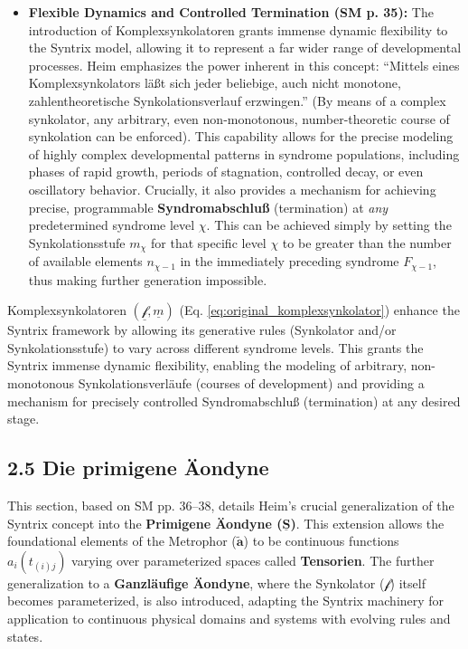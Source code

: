 \documentclass[12pt]{article}
\newcommand{\q}[1]{\enquote{#1}}
\newcommand{\metrophor}{\bm{\widetilde{a}}}
\newcommand{\synkolator}{\mathcal{f}}
\newcommand{\synkolationsstufe}{m}
\newcommand{\syndrom}{F} %
\begin{document}
\begin{itemize}
    \item \textbf{Flexible Dynamics and Controlled Termination (SM p. 35):}
    The introduction of Komplexsynkolatoren grants immense dynamic flexibility to the Syntrix model, allowing it to represent a far wider range of developmental processes. Heim emphasizes the power inherent in this concept: \q{Mittels eines Komplexsynkolators läßt sich jeder beliebige, auch nicht monotone, zahlentheoretische Synkolationsverlauf erzwingen.} (By means of a complex synkolator, any arbitrary, even non-monotonous, number-theoretic course of synkolation can be enforced). This capability allows for the precise modeling of highly complex developmental patterns in syndrome populations, including phases of rapid growth, periods of stagnation, controlled decay, or even oscillatory behavior. Crucially, it also provides a mechanism for achieving precise, programmable \textbf{Syndromabschluß} (termination) at \textit{any} predetermined syndrome level \( \chi \). This can be achieved simply by setting the Synkolationsstufe \( \synkolationsstufe_\chi \) for that specific level \( \chi \) to be greater than the number of available elements \( n_{\chi-1} \) in the immediately preceding syndrome \( \syndrom_{\chi-1} \), thus making further generation impossible.
\end{itemize}

Komplexsynkolatoren \( (\underline{\synkolator}, \underline{\synkolationsstufe}) \) (Eq. \eqref{eq:original_komplexsynkolator}) enhance the Syntrix framework by allowing its generative rules (Synkolator and/or Synkolationsstufe) to vary across different syndrome levels. This grants the Syntrix immense dynamic flexibility, enabling the modeling of arbitrary, non-monotonous Synkolationsverläufe (courses of development) and providing a mechanism for precisely controlled Syndromabschluß (termination) at any desired stage.

\subsection{2.5 Die primigene Äondyne}
\label{sec:aeondyne}

This section, based on SM pp. 36--38, details Heim's crucial generalization of the Syntrix concept into the \textbf{Primigene \"{A}ondyne (\(\underline{\bm{S}}\))}. This extension allows the foundational elements of the Metrophor (\(\metrophor\)) to be continuous functions \(a_i(t_{(i)j})\) varying over parameterized spaces called \textbf{Tensorien}. The further generalization to a \textbf{Ganzläufige \"{A}ondyne}, where the Synkolator (\(\synkolator\)) itself becomes parameterized, is also introduced, adapting the Syntrix machinery for application to continuous physical domains and systems with evolving rules and states.
\end{document}
